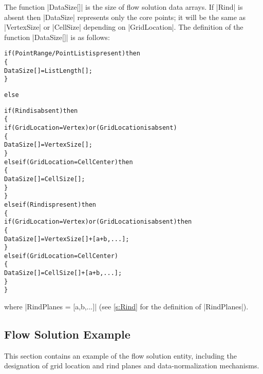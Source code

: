 The function |DataSize[]| is the size of flow solution data arrays.
If |Rind| is absent then |DataSize| represents only the core points;
it will be the same as |VertexSize| or |CellSize| depending on
|GridLocation|.
The definition of the function |DataSize[]| is as follows:
\begin{alltt}
\begin{changes}
  if (PointRange/PointList is present) then
    \{
    DataSize[] = ListLength[] ;
    \}
\end{changes}
  \begin{changes}else\end{changes} if (Rind is absent) then
    \{
    if (GridLocation = Vertex) or (GridLocation is absent)
      \{
      DataSize[] = VertexSize[] ;
      \}
    else if (GridLocation = CellCenter) then
      \{
      DataSize[] = CellSize[] ;
      \}
    \}
  else if (Rind is present) then
    \{
    if (GridLocation = Vertex) or (GridLocation is absent) then
      \{
      DataSize[] = VertexSize[] + [a + b,...] ;
      \}
    else if (GridLocation = CellCenter)
      \{
      DataSize[] = CellSize[] + [a + b,...] ;
      \}
    \}
\end{alltt}
where |RindPlanes = [a,b,...]| (see \autoref{s:Rind} 
for the definition of |RindPlanes|). 

\subsection{Flow Solution Example}
\label{s:flow_example}

This section contains an example of the flow solution entity, including
the designation of grid location and rind planes and data-normalization
mechanisms.

